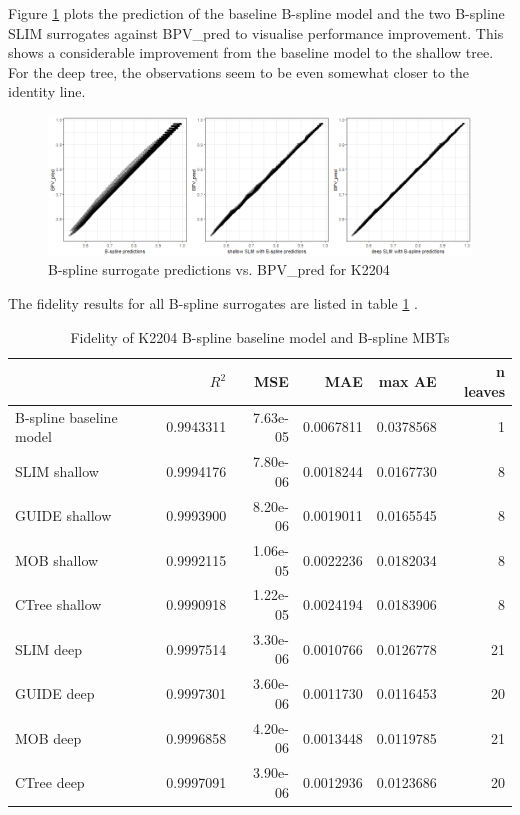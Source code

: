 Figure \ref{fig:ins_k2204_fit} plots the prediction of the baseline B-spline model and the two B-spline SLIM surrogates against BPV\_pred to visualise performance improvement. This shows a considerable improvement from the baseline model to the shallow tree. For the deep tree, the observations seem to be even somewhat closer to the identity line. 

\begin{figure}[!htb]
    \centering    
    \includegraphics[width = 14cm]{Figures/insurance_use_case/k2204_BPV/fit.png}
    \caption{B-spline surrogate predictions vs. BPV\_pred for K2204}
    \label{fig:ins_k2204_fit}
\end{figure}

The fidelity results for all B-spline surrogates are listed in table \ref{tab:ins_k2204_bsplines_surrogates_perf} .

\begin{table}
\centering \scriptsize
\begin{tabular}[t]{l|r|r|r|r|r}
\hline
  & $R^2$ & MSE & MAE & max AE & n leaves\\
\hline
B-spline baseline model & 0.9943311 & 7.63e-05 & 0.0067811 & 0.0378568 & 1\\
\hline
SLIM shallow & 0.9994176 & 7.80e-06 & 0.0018244 & 0.0167730 & 8\\
GUIDE shallow & 0.9993900 & 8.20e-06 & 0.0019011 & 0.0165545 & 8\\
MOB shallow & 0.9992115 & 1.06e-05 & 0.0022236 & 0.0182034 & 8\\
CTree shallow & 0.9990918 & 1.22e-05 & 0.0024194 & 0.0183906 & 8\\
\hline
SLIM deep & 0.9997514 & 3.30e-06 & 0.0010766 & 0.0126778 & 21\\
GUIDE deep & 0.9997301 & 3.60e-06 & 0.0011730 & 0.0116453 & 20\\
MOB deep & 0.9996858 & 4.20e-06 & 0.0013448 & 0.0119785 & 21\\
CTree deep & 0.9997091 & 3.90e-06 & 0.0012936 & 0.0123686 & 20\\
\hline
\end{tabular}
\label{tab:ins_k2204_bsplines_surrogates_perf}
\caption{Fidelity of K2204 B-spline baseline model and  B-spline MBTs}
\end{table}


